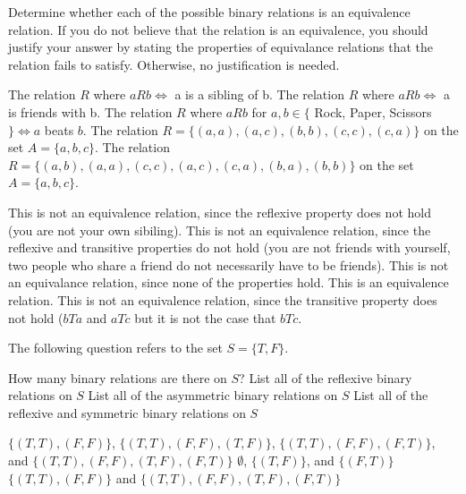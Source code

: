 \documentclass[solution, letterpaper]{cs20}
\begin{document}




Determine whether each of the possible binary relations is an equivalence relation. If you do not believe that the relation is an equivalence, you should justify your answer by stating the properties of equivalance relations that the relation fails to satisfy. Otherwise, no justification is needed.

\subproblem The relation $R$ where $aRb \iff$ a is a sibling of b.
\subproblem The relation $R$ where $aRb \iff$ a is friends with b.
\subproblem The relation $R$ where $aRb$ for $a, b \in \{$ Rock, Paper, Scissors $\} \iff a$ beats $b$.
\subproblem The relation $R = \{(a, a), (a, c), (b, b), (c, c), (c, a) \}$ on the set $A = \{a, b, c\}$.
\subproblem The relation $R = \{(a, b), (a, a), (c, c), (a, c), (c, a), (b, a), (b, b) \}$ on the set $A = \{a, b, c\}$.

\solution

\subsolution This is not an equivalence relation, since the reflexive property does not hold (you are not your own sibiling).
\subsolution This is not an equivalence relation, since the reflexive and transitive properties do not hold (you are not friends with yourself, two people who share a friend do not necessarily have to be friends).
\subsolution This is not an equivalance relation, since none of the properties hold.
\subsolution This is an equivalence relation.
\subsolution This is not an equivalence relation, since the transitive property does not hold ($bTa$ and $aTc$ but it is not the case that $bTc$.


The following question refers to the set $S = \{T, F\}$.

\subproblem How many binary relations are there on $S$?
\subproblem List all of the reflexive binary relations on $S$
\subproblem List all of the asymmetric binary relations on $S$
\subproblem List all of the reflexive and symmetric binary relations on $S$

\solution

\subsolution $\{(T, T), (F, F)\}$, $\{(T, T), (F, F), (T, F)\}$, $\{(T, T), (F, F), (F, T)\}$, and $\{(T, T), (F, F), (T, F), (F, T)\}$
\subsolution $\emptyset$, $\{(T, F)\}$, and $\{(F, T)\}$
\subsolution $\{(T, T), (F, F)\}$ and $\{(T, T), (F, F), (T, F), (F, T)\}$
\end{document}
